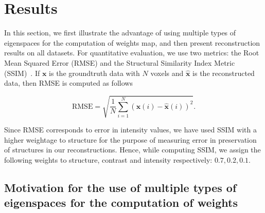 \documentclass[journal]{IEEEtran}
\begin{document}
\section{Results}
\label{sec:results_spatially_varying_prior}


In this section, we first illustrate the advantage of using multiple
types of eigenspaces for the computation of weights map, and then
present reconstruction results on all datasets. For quantitative
evaluation, we use two metrics: the Root Mean Squared Error (RMSE) and the
Structural Similarity Index Metric (SSIM)~\cite{ssim}. If
$\boldsymbol{x}$ is the groundtruth data with $N$ voxels and
$\hat{\boldsymbol{x}}$ is the reconstructed data, then RMSE is
computed as follows

\begin{equation}
  \textrm{RMSE} =\sqrt{\frac{1}{N}\sum_{i=1}^N(\boldsymbol{x}(i) -
    \hat{\boldsymbol{x}}(i))^2}.
 \end{equation}

Since RMSE corresponds to error in intensity values, we have used SSIM
with a higher weightage to structure for the purpose of measuring
error in preservation of structures in our reconstructions. Hence, while
computing SSIM, we assign the following weights to structure, contrast
and intensity respectively: $0.7,0.2,0.1$.


\subsection{Motivation for the use of multiple types of eigenspaces for the computation of weights}
\end{document}

